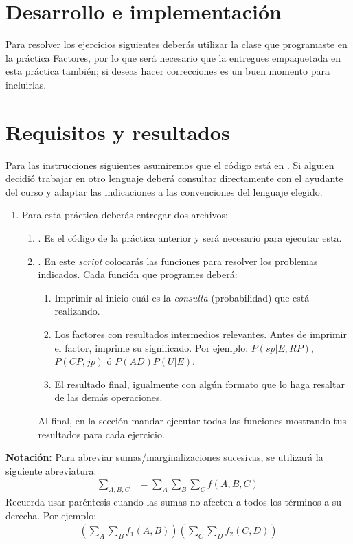 \section{Desarrollo e implementación}

Para resolver los ejercicios siguientes deberás utilizar la clase que programaste en la práctica Factores, por lo que será necesario que la entregues empaquetada en esta práctica también; si deseas hacer correcciones es un buen momento para incluirlas.

\section{Requisitos y resultados}

Para las instrucciones siguientes asumiremos que el código está en .  Si alguien decidió trabajar en otro lenguaje deberá consultar directamente con el ayudante del curso y adaptar las indicaciones a las convenciones del lenguaje elegido.

\begin{enumerate}
 \item Para esta práctica deberás entregar dos archivos:
 \begin{enumerate}
  \item {}.  Es el código de la práctica anterior y será necesario para ejecutar esta.
  \item {}.  En este \textit{script} colocarás las funciones para resolver los problemas indicados.  Cada función que programes deberá:
  \begin{enumerate}
   \item Imprimir al inicio cuál es la \emph{consulta} (probabilidad) que está realizando.
   \item Los factores con resultados intermedios relevantes.  Antes de imprimir el factor, imprime su significado.  Por ejemplo: $P(sp|E,RP)$, $P(CP,jp)$ ó $P(AD)P(U|E)$.
   \item El resultado final, igualmente con algún formato que lo haga resaltar de las demás operaciones.
  \end{enumerate}
  Al final, en la sección  mandar ejecutar todas las funciones mostrando tus resultados para cada ejercicio.
 \end{enumerate}
\end{enumerate}

\textbf{Notación:} Para abreviar sumas/marginalizaciones sucesivas, se utilizará la siguiente abreviatura:
\begin{align*}
 \sum_{A,B,C} &= \sum_A \sum_B \sum_C f(A,B,C)
\end{align*}
Recuerda usar paréntesis cuando las sumas no afecten a todos los términos a su derecha.  Por ejemplo:
\begin{align*}
 \left(\sum_A \sum_B  f_1(A,B)\right) \left( \sum_C \sum_D f_2(C,D) \right)
\end{align*}

